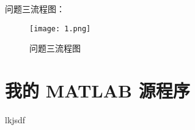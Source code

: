 \documentclass[bwprint]{cumcmthesis}
\begin{document}
问题三流程图：
\begin{figure}[!h]
\centering
\texttt{[image: 1.png]}
\caption{问题三流程图}
\end{figure}




\newpage
\appendix
\section{我的 MATLAB 源程序}
lkjsdf
\end{document}
